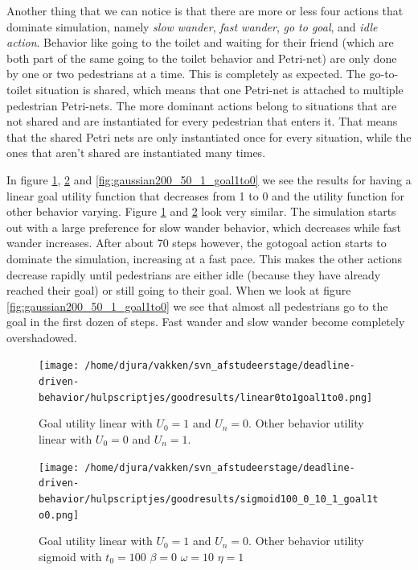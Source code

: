 \documentclass[11pt]{book}
\begin{document}
Another thing that we can notice is that there are more or less four actions that dominate simulation, namely \emph{slow wander}, \emph{fast wander}, \emph{go to goal}, and \emph{idle action}.
 Behavior like going to the toilet and waiting for their friend (which are both part of the same going to the toilet behavior and Petri-net) are only done by one or two pedestrians at a time. This is completely as expected. The go-to-toilet situation is shared, which means that one Petri-net is attached to multiple pedestrian Petri-nets. The more dominant actions belong to situations that are not shared and are instantiated for every pedestrian that enters it. That means that the shared Petri nets are only instantiated once for every situation, while the ones that aren't shared are instantiated many times.

In figure \ref{fig:linear0to1goal1to0}, \ref{fig:sigmoid100_0_10_1_goal1to0} and \ref{fig:gaussian200_50_1_goal1to0} we see the results for having a linear goal utility function that decreases from 1 to 0 and the utility function for other behavior varying. Figure \ref{fig:linear0to1goal1to0} and \ref{fig:sigmoid100_0_10_1_goal1to0} look very similar. The simulation starts out with a large preference for slow wander behavior, which decreases while fast wander increases. After about 70 steps however, the gotogoal action starts to dominate the simulation, increasing at a fast pace. This makes the other actions decrease rapidly until pedestrians are either idle (because they have already reached their goal) or still going to their goal. When we look at figure \ref{fig:gaussian200_50_1_goal1to0} we see that almost all pedestrians go to the goal in the first dozen of steps. Fast wander and slow wander become completely overshadowed.

 


\begin{figure}[b]
\centering            
\texttt{[image: /home/djura/vakken/svn\_afstudeerstage/deadline-driven-behavior/hulpscriptjes/goodresults/linear0to1goal1to0.png]}
\caption{Goal utility linear with $U_0=1$ and $U_n = 0$. Other behavior utility linear with  $U_0=0$ and $U_n=1$.}
\label{fig:linear0to1goal1to0}
\end{figure}

\begin{figure}[b]
\texttt{[image: /home/djura/vakken/svn\_afstudeerstage/deadline-driven-behavior/hulpscriptjes/goodresults/sigmoid100\_0\_10\_1\_goal1to0.png]}
\caption{Goal utility linear with $U_0=1$ and $U_n = 0$. Other behavior utility sigmoid with $t_0=100$ $\beta=0$ $\omega=10$ $\eta=1$}
\label{fig:sigmoid100_0_10_1_goal1to0}
\end{figure}
\end{document}
